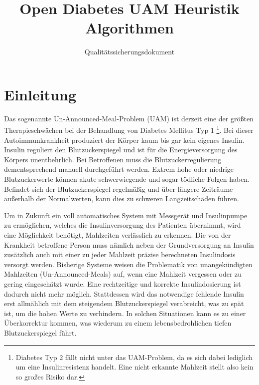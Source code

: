 \documentclass[accentcolor=tud0b,12pt,paper=a4]{tudreport}
\title{Open Diabetes UAM Heuristik Algorithmen}
\subtitle{Qualitätssicherungsdokument}
\begin{document}
	\maketitle
	\tableofcontents 
	
	\chapter{Einleitung}
Das sogenannte Un-Announced-Meal-Problem (UAM) ist derzeit eine der größten Therapieschwächen bei der Behandlung von Diabetes Mellitus Typ 1 \footnote{Diabetes Typ 2 fällt nicht unter das UAM-Problem, da es sich dabei lediglich um eine Insulinresistenz handelt. Eine nicht erkannte Mahlzeit stellt also kein so großes Risiko dar.}. Bei dieser Autoimmunkrankheit produziert der Körper kaum bis gar kein eigenes Insulin. Insulin reguliert den Blutzuckerspiegel und ist für die Energieversorgung des Körpers unentbehrlich. Bei Betroffenen muss die Blutzuckerregulierung dementsprechend  manuell durchgeführt werden. Extrem hohe oder niedrige Blutzuckerwerte können akute schwerwiegende und sogar tödliche Folgen haben. Befindet sich der Blutzuckerspiegel regelmäßig und über längere Zeiträume außerhalb der Normalwerten, kann dies zu schweren Langzeitschäden führen.

Um in Zukunft ein voll automatisches System mit Messgerät und Insulinpumpe zu ermöglichen, welches die Insulinversorgung des Patienten übernimmt, wird eine Möglichkeit benötigt, Mahlzeiten verlässlich zu erkennen. Die von der Krankheit betroffene Person muss nämlich neben der Grundversorgung an Insulin zusätzlich auch mit einer zu jeder Mahlzeit präzise berechneten Insulindosis versorgt werden. Bisherige Systeme weisen die Problematik von unangekündigten Mahlzeiten (Un-Announced-Meals) auf, wenn eine Mahlzeit vergessen oder zu gering eingeschätzt wurde. Eine rechtzeitige und korrekte Insulindosierung ist dadurch nicht mehr möglich. Stattdessen wird das notwendige fehlende Insulin erst allmählich mit dem steigendem Blutzuckerspiegel  verabreicht, was zu spät ist, um die hohen Werte zu verhindern. In solchen Situationen kann es zu einer Überkorrektur kommen, was wiederum zu einem lebensbedrohlichen tiefen Blutzuckerspiegel führt. 
\end{document}
